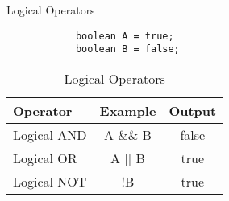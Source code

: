 \documentclass[10pt, compress]{beamer}
\begin{document}
\begin{slide}
	\begin{block}{Logical Operators}
		\begin{verbatim}
			boolean A = true;
			boolean B = false;
		\end{verbatim}
		\begin{table}
			\begin{tabular}{lcc}
				\toprule
				Operator & Example & Output\\
				\midrule
				Logical AND & A \&\& B & false\\
				Logical OR & A || B & true\\
				Logical NOT & !B & true\\
				\bottomrule
			\end{tabular}
			\caption{Logical Operators}
		\end{table}
	\end{block}
\end{slide}

\end{document}
